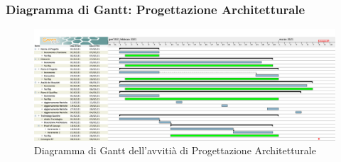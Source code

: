 \newpage
\subsubsection{Diagramma di Gantt: Progettazione Architetturale}

\begin{figure}[ht]
    \centering
    \includegraphics[width=\textwidth]{../../Immagini/GanttProgettazioneArchitetturale}
    \caption{Diagramma di Gantt dell'avvitià di Progettazione Architetturale}
\end{figure}